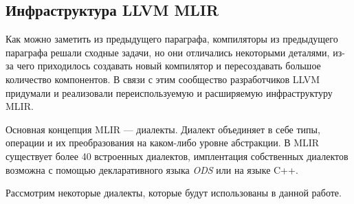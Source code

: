 \subsection{Инфраструктура LLVM MLIR}
\label{impl:mlir} %

Как можно заметить из предыдущего параграфа, компиляторы из предыдущего параграфа
решали сходные задачи, но они отличались некоторыми деталями, из-за чего
приходилось создавать новый компилятор и пересоздавать большое количество
компонентов. В связи с этим сообщество разработчиков LLVM придумали и реализовали
переиспользуемую и расширяемую инфраструктуру MLIR.

Основная концепция MLIR --- диалекты. Диалект объединяет в себе типы, операции
и их преобразования на каком-либо уровне абстракции. В MLIR существует более 40
встроенных диалектов, имплентация собственных диалектов возможна с помощью
декларативного языка \textit{ODS} или на языке C++.

Рассмотрим некоторые диалекты, которые будут использованы в данной работе.

